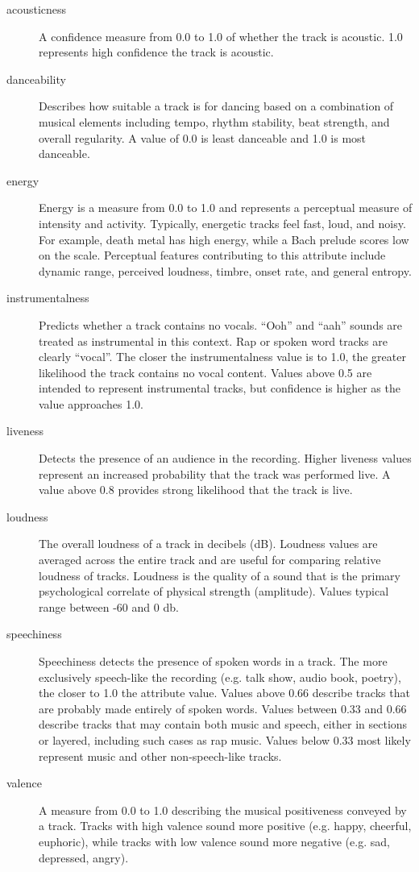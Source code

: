 \begin{description}
    \item[acousticness] A confidence measure from 0.0 to 1.0 of whether the track is acoustic. 1.0 represents high confidence the track is acoustic.
    \item[danceability] Describes how suitable a track is for dancing based on a combination of musical elements including tempo, rhythm stability, beat strength, and overall regularity. A value of 0.0 is least danceable and 1.0 is most danceable.
    \item[energy] Energy is a measure from 0.0 to 1.0 and represents a perceptual measure of intensity and activity. Typically, energetic tracks feel fast, loud, and noisy. For example, death metal has high energy, while a Bach prelude scores low on the scale. Perceptual features contributing to this attribute include dynamic range, perceived loudness, timbre, onset rate, and general entropy.
    \item[instrumentalness] Predicts whether a track contains no vocals. ``Ooh'' and ``aah'' sounds are treated as instrumental in this context. Rap or spoken word tracks are clearly ``vocal''. The closer the instrumentalness value is to 1.0, the greater likelihood the track contains no vocal content. Values above 0.5 are intended to represent instrumental tracks, but confidence is higher as the value approaches 1.0.
    \item[liveness] Detects the presence of an audience in the recording. Higher liveness values represent an increased probability that the track was performed live. A value above 0.8 provides strong likelihood that the track is live.
    \item[loudness] The overall loudness of a track in decibels (dB). Loudness values are averaged across the entire track and are useful for comparing relative loudness of tracks. Loudness is the quality of a sound that is the primary psychological correlate of physical strength (amplitude). Values typical range between -60 and 0 db.
    \item[speechiness] Speechiness detects the presence of spoken words in a track. The more exclusively speech-like the recording (e.g. talk show, audio book, poetry), the closer to 1.0 the attribute value. Values above 0.66 describe tracks that are probably made entirely of spoken words. Values between 0.33 and 0.66 describe tracks that may contain both music and speech, either in sections or layered, including such cases as rap music. Values below 0.33 most likely represent music and other non-speech-like tracks.
    \item[valence] A measure from 0.0 to 1.0 describing the musical positiveness conveyed by a track. Tracks with high valence sound more positive (e.g. happy, cheerful, euphoric), while tracks with low valence sound more negative (e.g. sad, depressed, angry).
\end{description}

